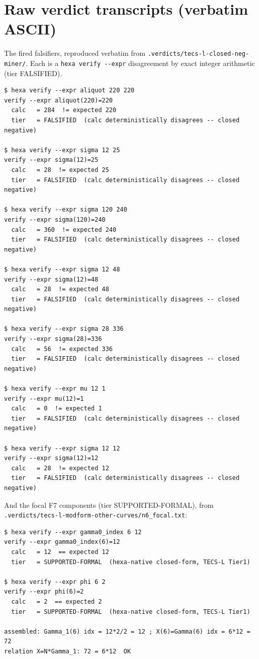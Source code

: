\documentclass[11pt,a4paper]{article}
\theoremstyle{definition}
\begin{document}
\section{Raw verdict transcripts (verbatim ASCII)}
\label{app:verdicts}

The fired falsifiers, reproduced verbatim from
\texttt{.verdicts/tecs-l-closed-neg-miner/}. Each is a \texttt{hexa verify
-{}-expr} disagreement by exact integer arithmetic (tier FALSIFIED).

\begin{verbatim}
$ hexa verify --expr aliquot 220 220
verify --expr aliquot(220)=220
  calc   = 284  != expected 220
  tier   = FALSIFIED  (calc deterministically disagrees -- closed negative)

$ hexa verify --expr sigma 12 25
verify --expr sigma(12)=25
  calc   = 28  != expected 25
  tier   = FALSIFIED  (calc deterministically disagrees -- closed negative)

$ hexa verify --expr sigma 120 240
verify --expr sigma(120)=240
  calc   = 360  != expected 240
  tier   = FALSIFIED  (calc deterministically disagrees -- closed negative)

$ hexa verify --expr sigma 12 48
verify --expr sigma(12)=48
  calc   = 28  != expected 48
  tier   = FALSIFIED  (calc deterministically disagrees -- closed negative)

$ hexa verify --expr sigma 28 336
verify --expr sigma(28)=336
  calc   = 56  != expected 336
  tier   = FALSIFIED  (calc deterministically disagrees -- closed negative)

$ hexa verify --expr mu 12 1
verify --expr mu(12)=1
  calc   = 0  != expected 1
  tier   = FALSIFIED  (calc deterministically disagrees -- closed negative)

$ hexa verify --expr sigma 12 12
verify --expr sigma(12)=12
  calc   = 28  != expected 12
  tier   = FALSIFIED  (calc deterministically disagrees -- closed negative)
\end{verbatim}

And the focal F7 components (tier SUPPORTED-FORMAL), from
\texttt{.verdicts/tecs-l-modform-other-curves/n6\_focal.txt}:

\begin{verbatim}
$ hexa verify --expr gamma0_index 6 12
verify --expr gamma0_index(6)=12
  calc   = 12  == expected 12
  tier   = SUPPORTED-FORMAL  (hexa-native closed-form, TECS-L Tier1)

$ hexa verify --expr phi 6 2
verify --expr phi(6)=2
  calc   = 2  == expected 2
  tier   = SUPPORTED-FORMAL  (hexa-native closed-form, TECS-L Tier1)

assembled: Gamma_1(6) idx = 12*2/2 = 12 ; X(6)=Gamma(6) idx = 6*12 = 72
relation X=N*Gamma_1: 72 = 6*12  OK
\end{verbatim}



\end{document}

